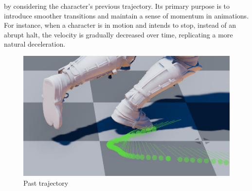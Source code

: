 \documentclass[12pt]{book}
\begin{document}
\begin{itemize}
          by considering the character’s previous trajectory. Its primary purpose is to introduce smoother
          transitions and maintain a sense of momentum in animations. For instance, when a character
          is in motion and intends to stop, instead of an abrupt halt, the velocity is gradually decreased
          over time, replicating a more natural deceleration.
          \begin{figure}[!h]
              \centering
              \includegraphics[scale=0.7]{./Figures/Images/trajectory-history.png}
              \caption{Past trajectory}
              \label{Past trajectory}
          \end{figure}
\end{itemize}
\end{document}

